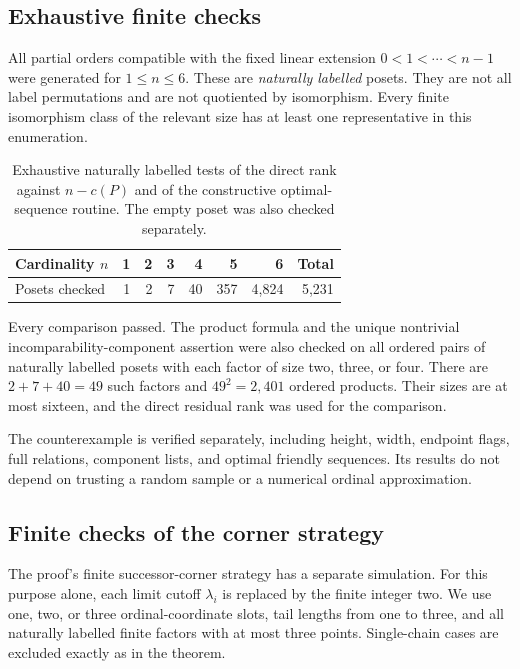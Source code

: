 \documentclass[11pt,letterpaper]{article}
\theoremstyle{definition}
\theoremstyle{remark}
\begin{document}
\subsection{Exhaustive finite checks}
All partial orders compatible with the fixed linear extension
$0<1<\cdots<n-1$ were generated for $1\le n\le6$. These are
\emph{naturally labelled} posets. They are not all label permutations and
are not quotiented by isomorphism. Every finite isomorphism class of the
relevant size has at least one representative in this enumeration.

\begin{table}[ht]
\centering
\begin{tabular}{@{}lrrrrrrr@{}}
\toprule
Cardinality $n$ & 1 & 2 & 3 & 4 & 5 & 6 & Total\\
\midrule
Posets checked & 1 & 2 & 7 & 40 & 357 & 4,824 & 5,231\\
\bottomrule
\end{tabular}
\caption{Exhaustive naturally labelled tests of the direct rank against
$n-c(P)$ and of the constructive optimal-sequence routine. The empty poset
was also checked separately.}
\label{tab:finite-tests}
\end{table}

Every comparison passed. The product formula and the unique nontrivial
incomparability-component assertion were also checked on all ordered pairs
of naturally labelled posets with each factor of size two, three, or four.
There are $2+7+40=49$ such factors and $49^2=2{,}401$ ordered products.
Their sizes are at most sixteen, and the direct residual rank was used
for the comparison.

The counterexample is verified separately, including height, width,
endpoint flags, full relations, component lists, and optimal friendly
sequences. Its results do not depend on trusting a random sample or a
numerical ordinal approximation.

\subsection{Finite checks of the corner strategy}
The proof's finite successor-corner strategy has a separate simulation.
For this purpose alone, each limit cutoff $\lambda_i$ is replaced by the
finite integer two. We use one, two, or three ordinal-coordinate slots,
tail lengths from one to three, and all naturally labelled finite factors
with at most three points. Single-chain cases are excluded exactly as in
the theorem.
\end{document}
